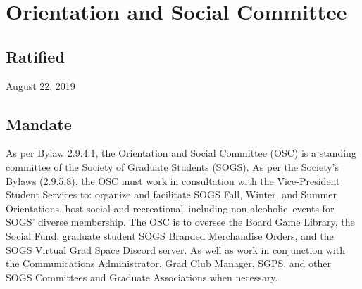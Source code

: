 \section{Orientation and Social Committee}
\subsection{Ratified}
August 22, 2019
\subsection{Mandate}
As per Bylaw 2.9.4.1, the Orientation and Social Committee (OSC) is a standing committee of the Society of Graduate Students (SOGS). As per the Society's Bylaws (2.9.5.8), the OSC must work in consultation with the Vice-President Student Services to: organize and facilitate SOGS Fall, Winter, and Summer Orientations, host social and recreational--including non-alcoholic--events for SOGS' diverse membership. The OSC is to oversee the Board Game Library, the Social Fund, graduate student SOGS Branded Merchandise Orders, and the SOGS Virtual Grad Space Discord server. As well as work in conjunction with the Communications Administrator, Grad Club Manager, SGPS, and other SOGS Committees and Graduate Associations when necessary.

